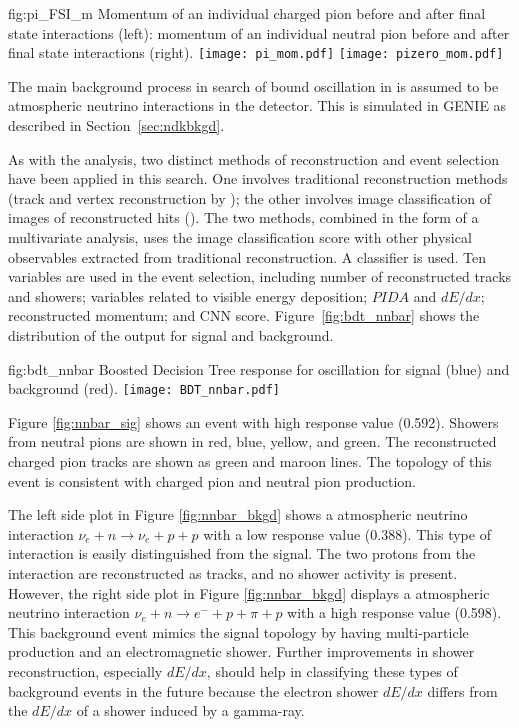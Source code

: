 \begin{dunefigure}
{fig:pi_FSI_m}
{Momentum of an individual charged pion before and after final state interactions (left): momentum of an individual neutral pion before and after final state interactions (right).}
\texttt{[image: pi\_mom.pdf]}
\texttt{[image: pizero\_mom.pdf]}
\end{dunefigure} 

The main background process in search of bound \nnbar oscillation in  is assumed to be atmospheric neutrino interactions in the detector.  This is simulated in GENIE as described in Section~\ref{sec:ndkbkgd}.

As with the \ptoknubar analysis, two distinct methods of reconstruction and event selection have been applied in this search. One involves traditional reconstruction methods (\threed track and vertex reconstruction by ); the other involves image classification 
of \twod images of reconstructed hits (). The two methods, combined in the form of a multivariate analysis, uses the image classification score with other physical observables extracted from traditional reconstruction.  A  classifier is used. Ten variables are used in the  event selection, including number of reconstructed tracks and showers; variables related to visible energy deposition; $PIDA$ and $dE/dx$; reconstructed momentum; and CNN score.  Figure~\ref{fig:bdt_nnbar} shows the distribution of the  output for signal and background.

\begin{dunefigure}
{fig:bdt_nnbar}
{Boosted Decision Tree response for \nnbar oscillation for signal (blue) and background (red).}
\texttt{[image: BDT\_nnbar.pdf]}
\end{dunefigure} 

Figure \ref{fig:nnbar_sig} shows an \nnbar event with high  response value (\num{0.592}). Showers from neutral pions are shown in red, blue, yellow, and green. The reconstructed charged pion tracks are shown as green and maroon lines. The topology of this event is consistent with charged pion and neutral pion production. 

The left side plot in Figure \ref{fig:nnbar_bkgd} shows a  atmospheric neutrino interaction $\nu_{e}+n\rightarrow \nu_{e}+p+p$ with a low  response value (\num{0.388}). This type of interaction is easily distinguished from the signal.  The two protons from the  interaction are reconstructed as tracks, and no shower activity is present. However, the right side plot in Figure \ref{fig:nnbar_bkgd} displays a  atmospheric neutrino interaction $\nu_{e}+n\rightarrow {e}^{-}+p+\pi +p$ with a high  response value (\num{0.598}). This background event mimics the signal topology by having multi-particle production and an electromagnetic shower. Further improvements in shower reconstruction, especially $dE/dx$, should help in classifying these types of background events in the future because the electron shower $dE/dx$ differs from the $dE/dx$ of a shower induced by a gamma-ray.

